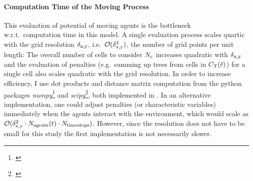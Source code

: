 \paragraph{Computation Time of the Moving Process}
This evaluation of potential of moving agents is the bottleneck w.r.t.\ computation time in this model.
A single evaluation process scales quartic with the grid resolution $\delta_{\rm x,y}$, i.e.\ $\mathcal{O}(\delta_{\rm x,y}^4)$, the number of grid points per unit length: The overall number of cells to consider $N_{\rm c}$ increases quadratic with $\delta_{\rm x,y}$ and the evaluation of penalties (e.g.\ summing up trees from cells in $C_{\rm T}(\tilde{c})$) for a single cell also scales quadratic with the grid resolution.
In order to increase efficiency, I use dot products and distance matrix computation from the python packages \textit{numpy}\footnote{\citet{numpy}} and \textit{scipy}\footnote{\citet{scipy}}, both implemented in \CC.
In an alternative implementation, one could adjust penalties (or characteristic variables) immediately when the agents interact with the environment, which would scale as $\mathcal{O}(\delta_{\rm x,y}^2\cdot N_{\rm agents}(t)\cdot N_{\rm timesteps})$.
However, since the resolution does not have to be small for this study %
the first implementation is not necessarily slower.
	
		
		


















